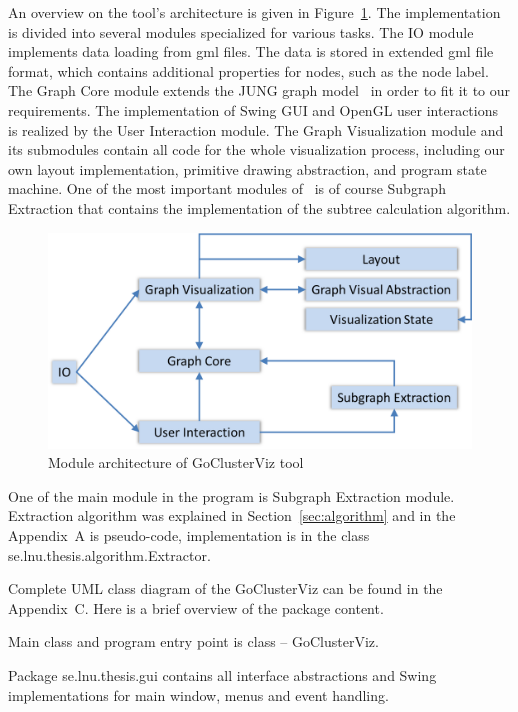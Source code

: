 An overview on the tool's architecture is given in Figure~\ref{fig:modules}. The implementation is divided into several modules specialized for various tasks. The \textsf{IO} module implements data loading from gml files. The data is stored in extended gml file format, which contains additional properties for nodes, such as the node label. The \textsf{Graph Core} module extends the JUNG graph model~\cite{JUNG} in order to fit it to our requirements. The implementation of Swing GUI and OpenGL user interactions is realized by the \textsf{User Interaction} module. The \textsf{Graph Visualization} module and its submodules contain all code for the whole visualization process, including our own layout implementation, primitive drawing abstraction, and program state machine. One of the most important modules of \tool\ is of course \textsf{Subgraph Extraction} that contains the implementation of the subtree calculation algorithm.

\begin{figure}[h!]
\centering
\includegraphics[scale=0.6]{pictures/modules.png}
\caption{Module architecture of GoClusterViz tool}
\label{fig:modules}
\end{figure}

One of the main module in the program is \textsf{Subgraph Extraction} module. Extraction algorithm was explained in Section~\ref{sec:algorithm} and in the Appendix~A is pseudo-code, implementation is in the class \textsf{se.lnu.thesis.algorithm.Extractor}.

Complete UML class diagram of the GoClusterViz can be found in the Appendix~C. Here is a brief overview of the package content.

Main class and program entry point is class -- \textsf{GoClusterViz}.

Package \textsf{se.lnu.thesis.gui} contains all interface abstractions and Swing implementations for main window, menus and event handling.

